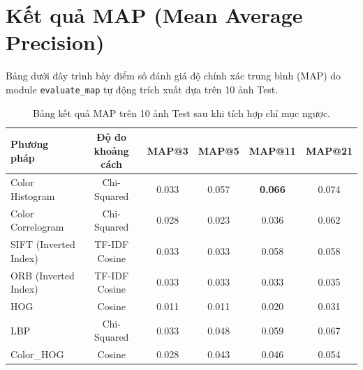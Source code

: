 \section{Kết quả MAP (Mean Average Precision)}
Bảng dưới đây trình bày điểm số đánh giá độ chính xác trung bình (MAP) do module \texttt{evaluate\_map} tự động trích xuất dựa trên 10 ảnh Test.

\begin{table}[H]
\centering
\begin{tabularx}{\textwidth}{|l|c|c|c|c|c|}
\hline
\textbf{Phương pháp} & \textbf{Độ đo khoảng cách} & \textbf{MAP@3} & \textbf{MAP@5} & \textbf{MAP@11} & \textbf{MAP@21} \\
\hline
Color Histogram & Chi-Squared & 0.033 & 0.057 & \textbf{0.066} & 0.074 \\
\hline
Color Correlogram & Chi-Squared & 0.028 & 0.023 & 0.036 & 0.062 \\
\hline
SIFT (Inverted Index) & TF-IDF Cosine & 0.033 & 0.033 & 0.058 & 0.058 \\
\hline
ORB (Inverted Index) & TF-IDF Cosine & 0.033 & 0.033 & 0.033 & 0.035 \\
\hline
HOG & Cosine & 0.011 & 0.011 & 0.020 & 0.031 \\
\hline
LBP & Chi-Squared & 0.033 & 0.048 & 0.059 & 0.067 \\
\hline
Color\_HOG & Cosine & 0.028 & 0.043 & 0.046 & 0.054 \\
\hline
\end{tabularx}
\caption{Bảng kết quả MAP trên 10 ảnh Test sau khi tích hợp chỉ mục ngược.}
\end{table}

